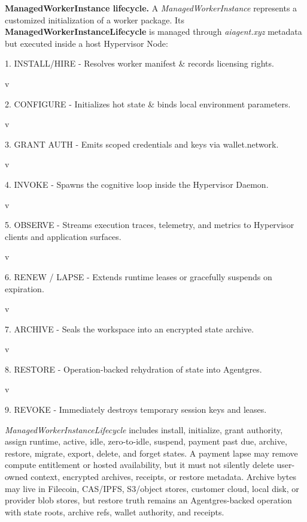 \documentclass[
  11pt,
]{article}
\begin{document}
\textbf{ManagedWorkerInstance lifecycle.} A
\emph{ManagedWorkerInstance} represents a customized initialization of a
worker package. Its \textbf{ManagedWorkerInstanceLifecycle} is managed
through \emph{aiagent.xyz} metadata but executed inside a host
Hypervisor Node:

1. INSTALL/HIRE - Resolves worker manifest \& records licensing rights.

\textbar{}

v

2. CONFIGURE - Initializes hot state \& binds local environment
parameters.

\textbar{}

v

3. GRANT AUTH - Emits scoped credentials and keys via wallet.network.

\textbar{}

v

4. INVOKE - Spawns the cognitive loop inside the Hypervisor Daemon.

\textbar{}

v

5. OBSERVE - Streams execution traces, telemetry, and metrics to
Hypervisor clients and application surfaces.

\textbar{}

v

6. RENEW / LAPSE - Extends runtime leases or gracefully suspends on
expiration.

\textbar{}

v

7. ARCHIVE - Seals the workspace into an encrypted state archive.

\textbar{}

v

8. RESTORE - Operation-backed rehydration of state into Agentgres.

\textbar{}

v

9. REVOKE - Immediately destroys temporary session keys and leases.

\emph{ManagedWorkerInstanceLifecycle} includes install, initialize,
grant authority, assign runtime, active, idle, zero-to-idle, suspend,
payment past due, archive, restore, migrate, export, delete, and forget
states. A payment lapse may remove compute entitlement or hosted
availability, but it must not silently delete user-owned context,
encrypted archives, receipts, or restore metadata. Archive bytes may
live in Filecoin, CAS/IPFS, S3/object stores, customer cloud, local disk,
or provider blob stores, but restore truth remains an Agentgres-backed
operation with state roots, archive refs, wallet authority, and receipts.
\end{document}
